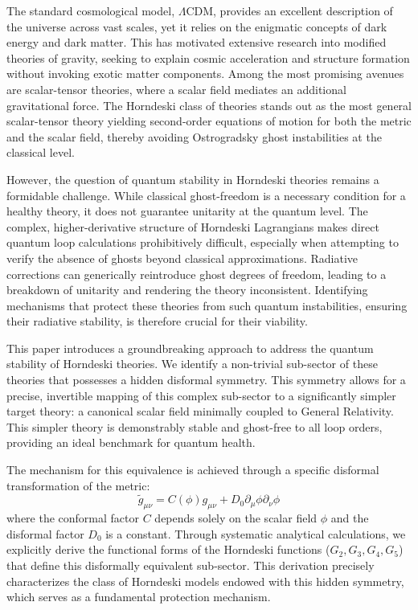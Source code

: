 \documentclass[twocolumn]{aastex631}
\begin{document}
The standard cosmological model, $\Lambda$CDM, provides an excellent description of the universe across vast scales, yet it relies on the enigmatic concepts of dark energy and dark matter. This has motivated extensive research into modified theories of gravity, seeking to explain cosmic acceleration and structure formation without invoking exotic matter components. Among the most promising avenues are scalar-tensor theories, where a scalar field mediates an additional gravitational force. The Horndeski class of theories stands out as the most general scalar-tensor theory yielding second-order equations of motion for both the metric and the scalar field, thereby avoiding Ostrogradsky ghost instabilities at the classical level.

However, the question of quantum stability in Horndeski theories remains a formidable challenge. While classical ghost-freedom is a necessary condition for a healthy theory, it does not guarantee unitarity at the quantum level. The complex, higher-derivative structure of Horndeski Lagrangians makes direct quantum loop calculations prohibitively difficult, especially when attempting to verify the absence of ghosts beyond classical approximations. Radiative corrections can generically reintroduce ghost degrees of freedom, leading to a breakdown of unitarity and rendering the theory inconsistent. Identifying mechanisms that protect these theories from such quantum instabilities, ensuring their radiative stability, is therefore crucial for their viability.

This paper introduces a groundbreaking approach to address the quantum stability of Horndeski theories. We identify a non-trivial sub-sector of these theories that possesses a hidden disformal symmetry. This symmetry allows for a precise, invertible mapping of this complex sub-sector to a significantly simpler target theory: a canonical scalar field minimally coupled to General Relativity. This simpler theory is demonstrably stable and ghost-free to all loop orders, providing an ideal benchmark for quantum health.

The mechanism for this equivalence is achieved through a specific disformal transformation of the metric:
\begin{equation*}
\tilde{g}_{\mu\nu} = C(\phi) g_{\mu\nu} + D_0 \partial_\mu\phi \partial_\nu\phi
\end{equation*}
where the conformal factor $C$ depends solely on the scalar field $\phi$ and the disformal factor $D_0$ is a constant. Through systematic analytical calculations, we explicitly derive the functional forms of the Horndeski functions ($G_2, G_3, G_4, G_5$) that define this disformally equivalent sub-sector. This derivation precisely characterizes the class of Horndeski models endowed with this hidden symmetry, which serves as a fundamental protection mechanism.
\end{document}
